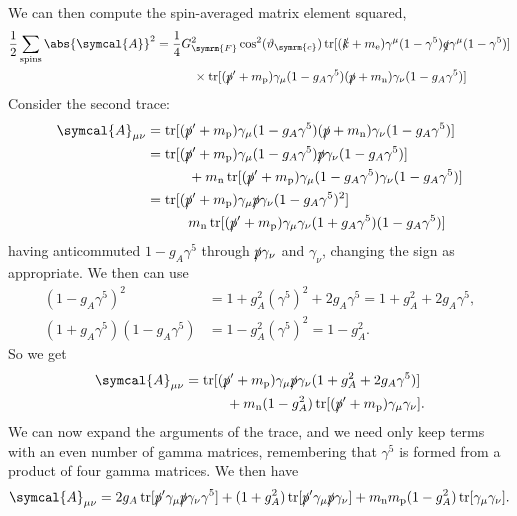 \documentclass[fleqn]{NotesClass}
\newcommand{\Pparticle}[1]{\mathrm{#1}}
\newcommand{\Pex}{\ensuremath{\Pparticle{e}}}
\newcommand{\Pp}{\ensuremath{\Pparticle{p}}}
\newcommand{\Pn}{\ensuremath{\Pparticle{n}}}
\newcommand{\amplitude}{\symcal{A}}
\DeclareMathOperator{\tr}{tr}
\newcommand{\fermiConst}{G_{\symrm{F}}}
\newcommand{\cabibboangle}{\vartheta_{\symrm{c}}}
\begin{document}
    We can then compute the spin-averaged matrix element squared,
    \begin{align}
        \frac{1}{2} \sum_{\text{spins}} \abs{\amplitude}^2 &= \frac{1}{4}\fermiConst^2\cos^2(\cabibboangle) \tr[(\slashed{k} + m_{\Pex})\gamma^\mu(1 - \gamma^5)\slashed{q}\gamma^\mu(1 - \gamma^5)]\\
        &\quad\qquad \times \tr[(\slashed{p}' + m_{\Pp})\gamma_\mu(1 - g_A\gamma^5)(\slashed{p} + m_{\Pn})\gamma_\nu(1 - g_A\gamma^5)] \notag
    \end{align}
    Consider the second trace:
    \begin{align}
        \amplitude_{\mu\nu} &= \tr[(\slashed{p}' + m_{\Pp})\gamma_\mu(1 - g_A\gamma^5)(\slashed{p} + m_{\Pn})\gamma_\nu(1 - g_A\gamma^5)]\\
        &= \tr[(\slashed{p}' + m_{\Pp})\gamma_\mu(1 - g_A\gamma^5)\slashed{p}\gamma_\nu(1 - g_A\gamma^5)]\\
        &\quad\qquad + m_{\Pn}\tr[(\slashed{p}' + m_{\Pp})\gamma_\mu(1 - g_A\gamma^5)\gamma_\nu(1 - g_A\gamma^5)]\\
        &= \tr[(\slashed{p}' + m_{\Pp})\gamma_\mu\slashed{p}\gamma_\nu(1 - g_A\gamma^5)^2]\\
        &\quad\qquad m_{\Pn}\tr[(\slashed{p}' + m_{\Pp})\gamma_\mu\gamma_\nu(1 + g_A\gamma^5)(1 - g_A\gamma^5)]
    \end{align}
    having anticommuted \(1 - g_A\gamma^5\) through \(\slashed{p}\gamma_\nu\) and \(\gamma_\nu\), changing the sign as appropriate.
    We then can use
    \begin{align}
        (1 - g_A\gamma^5)^2 &= 1 + g_A^2(\gamma^5)^2 + 2g_A\gamma^5 = 1 + g_A^2 + 2g_A\gamma^5,\\
        (1 + g_A\gamma^5)(1 - g_A\gamma^5) &= 1 - g_A^2(\gamma^5)^2 = 1 - g_A^2.
    \end{align}
    So we get
    \begin{align}
        \amplitude_{\mu\nu} &= \tr[(\slashed{p}' + m_{\Pp})\gamma_\mu\slashed{p}\gamma_\nu(1 + g_A^2 + 2g_A\gamma^5)]\\
        &\quad\qquad + m_{\Pn}(1 - g_A^2)\tr[(\slashed{p}' + m_{\Pp})\gamma_\mu\gamma_\nu].
    \end{align}
    We can now expand the arguments of the trace, and we need only keep terms with an even number of gamma matrices, remembering that \(\gamma^5\) is formed from a product of four gamma matrices.
    We then have
    \begin{equation*}
        \amplitude_{\mu\nu} = 2g_A\tr[\slashed{p}'\gamma_\mu\slashed{p}\gamma_\nu\gamma^5] + (1 + g_A^2)\tr[\slashed{p}'\gamma_\mu\slashed{p}\gamma_\nu] + m_{\Pn}m_{\Pp}(1 - g_A^2)\tr[\gamma_\mu\gamma_\nu].
    \end{equation*}
\end{document}
